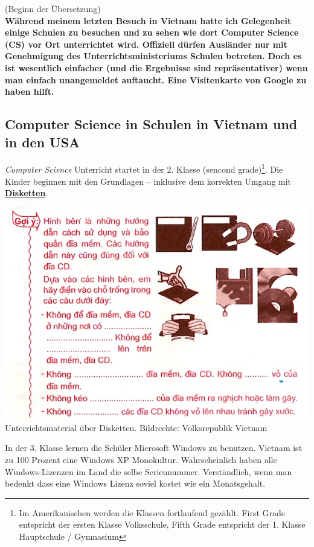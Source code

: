\documentclass[10pt,a4paper,ngerman,twoside]{article} %
\begin{document}
\begin{multicols}{3}
(Beginn der Übersetzung) \\

\textbf{Während meinem letzten Besuch in Vietnam hatte ich Gelegenheit einige Schulen zu besuchen und zu sehen wie dort Computer Science (CS) vor Ort unterrichtet wird. Offiziell dürfen Ausländer nur mit Genehmigung des Unterrichtsministeriums Schulen betreten. Doch es ist wesentlich einfacher (und die Ergebnisse sind repräsentativer) wenn man einfach unangemeldet auftaucht. Eine Visitenkarte von Google zu haben hilft.}

\subsection*{Computer Science in Schulen in Vietnam und in den USA}


\textit{Computer Science} Unterricht startet in der 2. Klasse (sencond grade)\footnote{Im Amerikanischen werden die Klassen fortlaufend gez\"ahlt. First Grade entspricht der ersten Klasse Volksschule, Fifth Grade entspricht der 1. Klasse Hauptschule / Gymnasium}. Die Kinder beginnen mit den Grundlagen -- inklusive dem korrekten Umgang mit \href{http://de.wikipedia.org/wiki/Diskette}{\textbf{Disketten}}.
\begin{center}
\includegraphics[width=\linewidth]{vietnam/vietnam_disketten.jpg}
\footnotesize{Unterrichtsmaterial über Disketten. Bildrechte: Volksrepublik Vietnam}
\end{center}
In der 3. Klasse lernen die Schüler Microsoft Windows zu benutzen. Vietnam ist zu 100 Prozent eine Windows XP Monokultur. Wahrscheinlich haben alle Windows-Lizenzen im Land die selbe Seriennummer. Verständlich, wenn man bedenkt dass eine Windows Lizenz soviel kostet wie ein Monatsgehalt.


\end{multicols}
\end{document}
